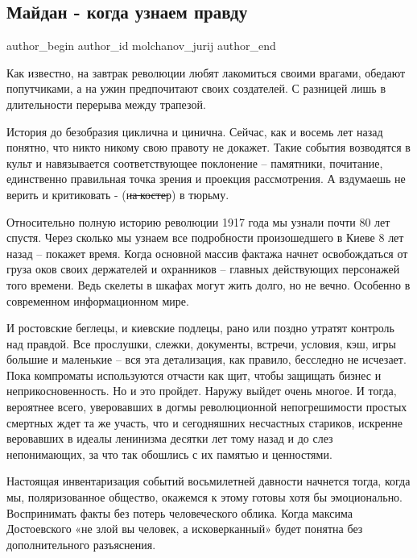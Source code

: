  
 
 
 
 
 
\subsection{Майдан - когда узнаем правду}
\label{sec:21_11_2021.fb.molchanov_jurij.1.maidan_kogda_uznajem_pravdu}
 
\ifcmt
 author_begin
   author_id molchanov_jurij
 author_end
\fi

Как известно, на завтрак революции любят лакомиться своими врагами, обедают
попутчиками, а на ужин предпочитают своих создателей. С разницей лишь в
длительности перерыва между трапезой.

История до безобразия циклична и цинична. Сейчас, как и восемь лет назад
понятно, что никто никому свою правоту не докажет. Такие события возводятся в
культ и навязывается соответствующее поклонение – памятники, почитание,
единственно правильная точка зрения и проекция рассмотрения. А вздумаешь не
верить и критиковать - (н̶а̶ ̶к̶о̶с̶т̶е̶р) в тюрьму.

Относительно полную историю революции 1917 года мы узнали почти 80 лет спустя.
Через сколько мы узнаем все подробности произошедшего в Киеве 8 лет назад –
покажет время. Когда основной массив фактажа начнет освобождаться от груза оков
своих держателей и охранников – главных действующих персонажей того времени.
Ведь скелеты в шкафах могут жить долго, но не вечно. Особенно в современном
информационном мире. 

И ростовские беглецы, и киевские подлецы, рано или поздно утратят контроль над
правдой. Все прослушки, слежки, документы, встречи, условия, кэш, игры большие
и маленькие – вся эта детализация, как правило, бесследно не исчезает. Пока
компроматы используются отчасти как щит, чтобы защищать бизнес и
неприкосновенность. Но и это пройдет. Наружу выйдет очень многое. И тогда,
вероятнее всего, уверовавших в догмы революционной непогрешимости простых
смертных ждет та же участь, что и сегодняшних несчастных стариков, искренне
веровавших в идеалы ленинизма десятки лет тому назад и до слез непонимающих, за
что так обошлись с их памятью и ценностями.

Настоящая инвентаризация событий восьмилетней давности начнется тогда, когда
мы, поляризованное общество, окажемся к этому готовы хотя бы эмоционально.
Воспринимать факты без потерь человеческого облика. Когда максима Достоевского
«не злой вы человек, а исковерканный» будет понятна без дополнительного
разъяснения.

